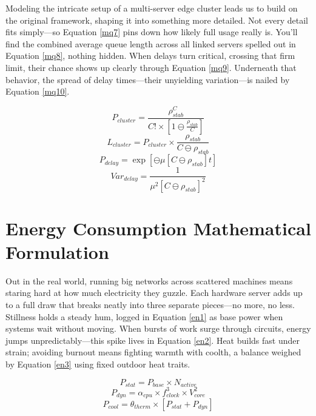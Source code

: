 \documentclass[a4paper,fleqn]{cas-dc}
\numberwithin{equation}{section}
\begin{document}
Modeling the intricate setup of a multi-server edge cluster leads us to build on the original framework, shaping it into something more detailed. Not every detail fits simply—so Equation \ref{mq7} pins down how likely full usage really is. You'll find the combined average queue length across all linked servers spelled out in Equation \ref{mq8}, nothing hidden. When delays turn critical, crossing that firm limit, their chance shows up clearly through Equation \ref{mq9}. Underneath that behavior, the spread of delay times—their unyielding variation—is nailed by Equation \ref{mq10}.

\begin{equation} P_{cluster} = \frac{\rho_{stab}^{C}}{C! \times [1 \ominus \frac{\rho_{stab}}{C}]} \label{mq7} \end{equation}
\begin{equation} L_{cluster} = P_{cluster} \times \frac{\rho_{stab}}{C \ominus \rho_{stab}} \label{mq8} \end{equation}
\begin{equation} P_{delay} = \exp\left[ \ominus \mu [ C \ominus \rho_{stab} ] t \right] \label{mq9} \end{equation}
\begin{equation} Var_{delay} = \frac{1}{\mu^{2} [ C \ominus \rho_{stab} ]^{2}} \label{mq10} \end{equation}

\section{Energy Consumption Mathematical Formulation}

Out in the real world, running big networks across scattered machines means staring hard at how much electricity they guzzle. Each hardware server adds up to a full draw that breaks neatly into three separate pieces—no more, no less. Stillness holds a steady hum, logged in Equation \ref{en1} as base power when systems wait without moving. When bursts of work surge through circuits, energy jumps unpredictably—this spike lives in Equation \ref{en2}. Heat builds fast under strain; avoiding burnout means fighting warmth with coolth, a balance weighed by Equation \ref{en3} using fixed outdoor heat traits.

\begin{equation} P_{stat} = P_{base} \times N_{active} \label{en1} \end{equation}
\begin{equation} P_{dyn} = \alpha_{cpu} \times f_{clock}^{3} \times V_{core}^{2} \label{en2} \end{equation}
\begin{equation} P_{cool} = \theta_{therm} \times [ P_{stat} + P_{dyn} ] \label{en3} \end{equation}
\end{document}
